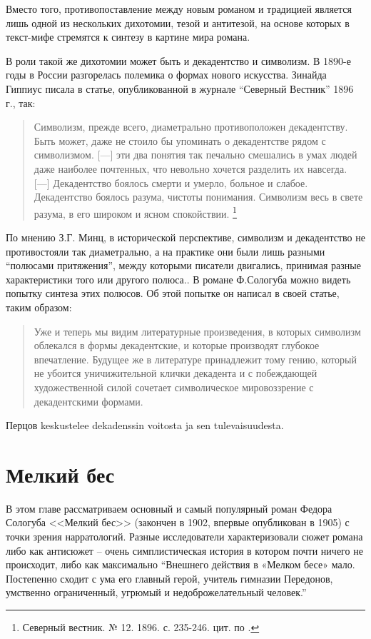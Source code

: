 \documentclass[12pt,a4paper]{article}
\begin{document}
Вместо того, противопоставление между новым романом и традицией является лишь одной из нескольких дихотомии, тезой и антитезой, на основе которых в текст-мифе стремятся к синтезу в картине мира романа.

В роли такой же дихотомии может быть и декадентство и символизм. В 1890-е годы в России разгорелась полемика о формах нового искусства. Зинайда Гиппиус писала в статье, опубликованной в журнале \enquote{Северный Вестник} 1896 г., так: 

\begin{quote}
Символизм, прежде всего, диаметрально противоположен декадентству. Быть может, даже не стоило бы упоминать о декадентстве рядом с символизмом. [---] эти два понятия так печально смешались в умах людей даже наиболее почтенных, что невольно хочется разделить их навсегда. [---] Декадентство боялось смерти и умерло, больное и слабое. Декадентство боялось разума, чистоты понимания. Символизм весь в свете разума, в его широком и ясном спокойствии. \footnote{Северный вестник. № 12. 1896. с. 235-246. цит. по \cite[150]{pavlova2007}.}
\end{quote}

По мнению З.Г. Минц, в исторической перспективе, символизм и декадентство не противостояли так диаметрально, а на практике они были лишь разными \enquote{полюсами притяжения}, между которыми писатели двигались, принимая разные характеристики того или другого полюса.\parencite[62]{mints2004}. В романе Ф.Сологуба можно видеть попытку синтеза этих полюсов. Об этой попытке он написал в своей статье, таким образом:

\begin{quote}
Уже и теперь мы видим литературные произведения, в которых символизм облекался в формы декадентские, и которые производят глубокое впечатление. Будущее же в литературе принадлежит тому гению, который не убоится уничижительной клички декадента и с побеждающей художественной силой сочетает символическое мировоззрение с декадентскими формами.
\parencite[501.]{ref:sologub2007}
\end{quote}

Перцов keskustelee dekadenssin voitosta ja sen tulevaisuudesta. \parencite[514]{pavlova2016}

\section{Мелкий бес}

В этом главе рассматриваем основный и самый популярный роман Федора Сологуба <<Мелкий бес>> (закончен в 1902, впервые опубликован в 1905) с точки зрения нарратологий. Разные исследователи характеризовали сюжет романа либо как антисюжет -- очень симплистическая история в котором почти ничего не происходит, либо как максимально  
\enquote{Внешнего действия в «Мелком бесе» мало. Постепенно сходит с ума его главный герой, учитель гимназии Передонов, умственно ограниченный, угрюмый и недоброжелательный человек.}
\autocite[432.]{grigorjev1983}
\end{document}
